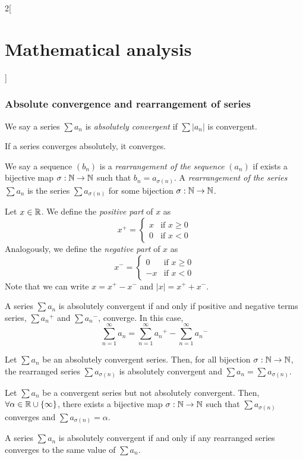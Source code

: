 \documentclass[../../../main_math.tex]{subfiles}
\begin{document}
\begin{multicols}{2}[\section{Mathematical analysis}]
  \subsubsection{Absolute convergence and rearrangement of series}
  \begin{definition}
    We say a series $\sum a_n$ is \emph{absolutely convergent} if $\sum |a_n|$ is convergent.
  \end{definition}
  \begin{theorem}
    If a series converges absolutely, it converges.
  \end{theorem}
  \begin{definition}
    We say a sequence $(b_n)$ is a \emph{rearrangement of the sequence} $(a_n)$ if exists a bijective map $\sigma:\mathbb{N} \rightarrow\mathbb{N} $ such that $b_n=a_{\sigma(n)}$. A \emph{rearrangement of the series} $\sum a_n$ is the series $\sum a_{\sigma(n)}$ for some bijection $\sigma:\mathbb{N} \rightarrow\mathbb{N} $.
  \end{definition}
  \begin{definition}
    Let $x\in\mathbb{R}$. We define the \emph{positive part} of $x$ as $$x^+=
      \begin{cases}
        x & \text{if }x\geq 0 \\
        0 & \text{if }x<0
      \end{cases}$$ Analogously, we define the \emph{negative part} of $x$ as $$x^-=
      \begin{cases}
        0  & \text{if }x\geq 0 \\
        -x & \text{if }x<0
      \end{cases}$$ Note that we can write $x=x^+-x^-$ and $|x|=x^++x^-$.
  \end{definition}
  \begin{theorem}
    A series $\sum a_n$ is absolutely convergent if and only if positive and negative terms series, $\sum {a_n}^+$ and $\sum {a_n}^-$, converge. In this case, $$\sum_{n=1}^\infty a_n=\sum_{n=1}^\infty {a_n}^+-\sum_{n=1}^\infty {a_n}^-$$
  \end{theorem}
  \begin{theorem}
    Let $\sum a_n$ be an absolutely convergent series. Then, for all bijection $\sigma:\mathbb{N} \rightarrow\mathbb{N} $, the rearranged series $\sum a_{\sigma(n)}$ is absolutely convergent and $\sum a_n=\sum a_{\sigma(n)}$.
  \end{theorem}
  \begin{theorem}
    Let $\sum a_n$ be a convergent series but not absolutely convergent. Then, $\forall\alpha\in\mathbb{R} \cup\{\infty\}$, there exists a bijective map $\sigma:\mathbb{N} \rightarrow\mathbb{N} $ such that $\sum a_{\sigma(n)}$ converges and $\sum a_{\sigma(n)}=\alpha$.
  \end{theorem}
  \begin{theorem}
    A series $\sum a_n$ is absolutely convergent if and only if any rearranged series converges to the same value of $\sum a_n$.
  \end{theorem}

\end{multicols}
\end{document}
